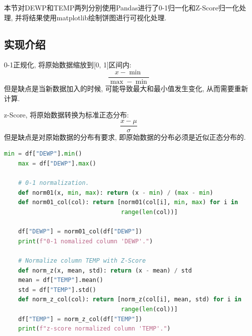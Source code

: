 本节对DEWP和TEMP两列分别使用Pandas进行了0-1归一化和Z-Score归一化处理,
并将结果使用matplotlib绘制饼图进行可视化处理.

\subsection{实现介绍}
0-1正规化, 将原始数据缩放到[0, 1]区间内:
\begin{equation}
    \frac{x-\min}{\max - \min}
\end{equation}
但是缺点是当新数据加入的时候, 可能导致最大和最小值发生变化, 从而需要重新计算.

z-Score, 将原始数据转换为标准正态分布:
\begin{equation}
    \frac{x-\mu}{\sigma}
\end{equation}
但是缺点是对原始数据的分布有要求, 即原始数据的分布必须是近似正态分布的.

\begin{lstlisting}[language=Python]
    min = df["DEWP"].min()
    max = df["DEWP"].max()

    # 0-1 normalization.
    def norm01(x, min, max): return (x - min) / (max - min)
    def norm01_col(col): return [norm01(col[i], min, max) for i in
                                 range(len(col))]

    df["DEWP"] = norm01_col(df["DEWP"])
    print(f"0-1 nomalized column 'DEWP'.")

    # Normalize column TEMP with Z-Score
    def norm_z(x, mean, std): return (x - mean) / std
    mean = df["TEMP"].mean()
    std = df["TEMP"].std()
    def norm_z_col(col): return [norm_z(col[i], mean, std) for i in
                                 range(len(col))]
    df["TEMP"] = norm_z_col(df["TEMP"])
    print(f"z-score normalized column 'TEMP'.") 
\end{lstlisting}

